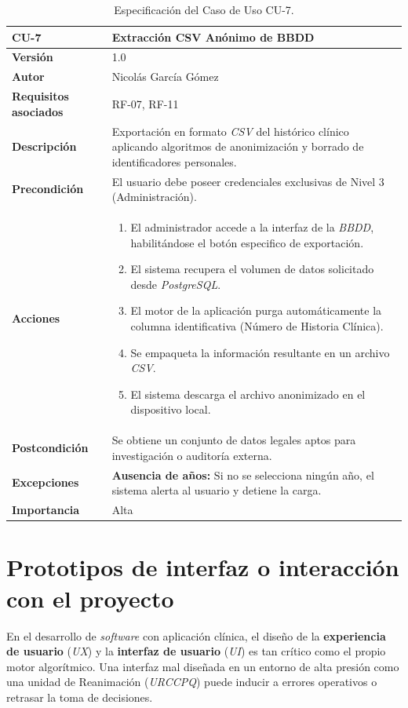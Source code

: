 \begin{itemize}
\begin{table}[hbt!]	\centering
	\begin{tabularx}{\linewidth}{ p{} p{} }
		\toprule
		\textbf{CU-7}    & \textbf{Extracción CSV Anónimo de BBDD}\\
		\toprule
		\textbf{Versión}              & 1.0    \\
		\textbf{Autor}                & Nicolás García Gómez \\
		\textbf{Requisitos asociados} & RF-07, RF-11 \\
		\textbf{Descripción}          & Exportación en formato \textit{CSV} del histórico clínico aplicando algoritmos de anonimización y borrado de identificadores personales. \\
		\textbf{Precondición}         & El usuario debe poseer credenciales exclusivas de Nivel 3 (Administración). \\
		\textbf{Acciones}             &
		\begin{enumerate}
			\def\labelenumi{\arabic{enumi}.}
			\item El administrador accede a la interfaz de la \textit{BBDD}, habilitándose el botón especifico de exportación.
			\item El sistema recupera el volumen de datos solicitado desde \textit{PostgreSQL}.
			\item El motor de la aplicación purga automáticamente la columna identificativa (Número de Historia Clínica).
			\item Se empaqueta la información resultante en un archivo \textit{CSV}.
			\item El sistema descarga el archivo anonimizado en el dispositivo local.
		\end{enumerate}\\
		\textbf{Postcondición}        & Se obtiene un conjunto de datos legales aptos para investigación o auditoría externa. \\
		\textbf{Excepciones}          & \textbf{Ausencia de años:} Si no se selecciona ningún  año, el sistema alerta al usuario y detiene la carga. \\
		\textbf{Importancia}          & Alta \\
		\bottomrule
	\end{tabularx}
	\caption{Especificación del Caso de Uso CU-7.}
	\label{tab:7}
\end{table}	
\end{itemize}

\section{Prototipos de interfaz o interacción con el proyecto}
En el desarrollo de \textit{software} con aplicación clínica, el diseño de la \textbf{experiencia de usuario} (\textit{UX}) y la \textbf{interfaz de usuario} (\textit{UI}) es tan crítico como el propio motor algorítmico. Una interfaz mal diseñada en un entorno de alta presión como una unidad de Reanimación (\textit{URCCPQ}) puede inducir a errores operativos o retrasar la toma de decisiones. 

